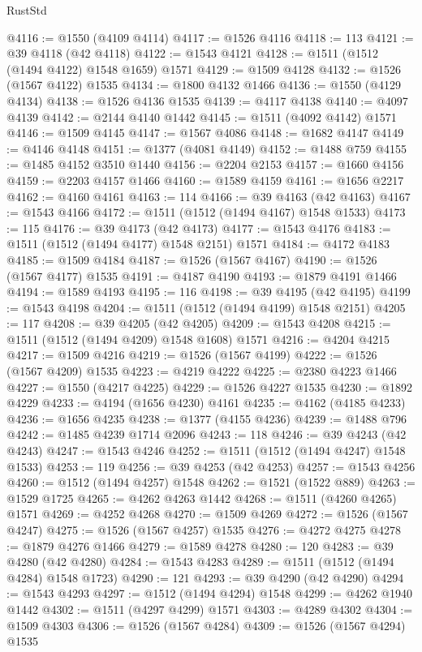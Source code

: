 \begin{lexlean}{RustStd}
\begin{coremodule}
{{@4116 := @1550 (@4109 @4114)
@4117 := @1526 @4116
@4118 := 113
@4121 := @39 @4118 (@42 @4118)
@4122 := @1543 @4121
@4128 := @1511 (@1512 (@1494 @4122) @1548 @1659) @1571
@4129 := @1509 @4128
@4132 := @1526 (@1567 @4122) @1535
@4134 := @1800 @4132 @1466
@4136 := @1550 (@4129 @4134)
@4138 := @1526 @4136 @1535
@4139 := @4117 @4138
@4140 := @4097 @4139
@4142 := @2144 @4140 @1442
@4145 := @1511 (@4092 @4142) @1571
@4146 := @1509 @4145
@4147 := @1567 @4086
@4148 := @1682 @4147
@4149 := @4146 @4148
@4151 := @1377 (@4081 @4149)
@4152 := @1488 @759
@4155 := @1485 @4152 @3510 @1440
@4156 := @2204 @2153
@4157 := @1660 @4156
@4159 := @2203 @4157 @1466
@4160 := @1589 @4159
@4161 := @1656 @2217
@4162 := @4160 @4161
@4163 := 114
@4166 := @39 @4163 (@42 @4163)
@4167 := @1543 @4166
@4172 := @1511 (@1512 (@1494 @4167) @1548 @1533)
@4173 := 115
@4176 := @39 @4173 (@42 @4173)
@4177 := @1543 @4176
@4183 := @1511 (@1512 (@1494 @4177) @1548 @2151) @1571
@4184 := @4172 @4183
@4185 := @1509 @4184
@4187 := @1526 (@1567 @4167)
@4190 := @1526 (@1567 @4177) @1535
@4191 := @4187 @4190
@4193 := @1879 @4191 @1466
@4194 := @1589 @4193
@4195 := 116
@4198 := @39 @4195 (@42 @4195)
@4199 := @1543 @4198
@4204 := @1511 (@1512 (@1494 @4199) @1548 @2151)
@4205 := 117
@4208 := @39 @4205 (@42 @4205)
@4209 := @1543 @4208
@4215 := @1511 (@1512 (@1494 @4209) @1548 @1608) @1571
@4216 := @4204 @4215
@4217 := @1509 @4216
@4219 := @1526 (@1567 @4199)
@4222 := @1526 (@1567 @4209) @1535
@4223 := @4219 @4222
@4225 := @2380 @4223 @1466
@4227 := @1550 (@4217 @4225)
@4229 := @1526 @4227 @1535
@4230 := @1892 @4229
@4233 := @4194 (@1656 @4230) @4161
@4235 := @4162 (@4185 @4233)
@4236 := @1656 @4235
@4238 := @1377 (@4155 @4236)
@4239 := @1488 @796
@4242 := @1485 @4239 @1714 @2096
@4243 := 118
@4246 := @39 @4243 (@42 @4243)
@4247 := @1543 @4246
@4252 := @1511 (@1512 (@1494 @4247) @1548 @1533)
@4253 := 119
@4256 := @39 @4253 (@42 @4253)
@4257 := @1543 @4256
@4260 := @1512 (@1494 @4257) @1548
@4262 := @1521 (@1522 @889)
@4263 := @1529 @1725
@4265 := @4262 @4263 @1442
@4268 := @1511 (@4260 @4265) @1571
@4269 := @4252 @4268
@4270 := @1509 @4269
@4272 := @1526 (@1567 @4247)
@4275 := @1526 (@1567 @4257) @1535
@4276 := @4272 @4275
@4278 := @1879 @4276 @1466
@4279 := @1589 @4278
@4280 := 120
@4283 := @39 @4280 (@42 @4280)
@4284 := @1543 @4283
@4289 := @1511 (@1512 (@1494 @4284) @1548 @1723)
@4290 := 121
@4293 := @39 @4290 (@42 @4290)
@4294 := @1543 @4293
@4297 := @1512 (@1494 @4294) @1548
@4299 := @4262 @1940 @1442
@4302 := @1511 (@4297 @4299) @1571
@4303 := @4289 @4302
@4304 := @1509 @4303
@4306 := @1526 (@1567 @4284)
@4309 := @1526 (@1567 @4294) @1535
}}
\end{coremodule}
\end{lexlean}

